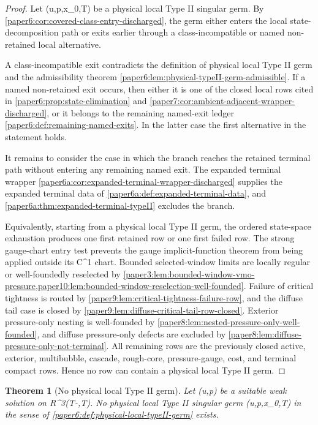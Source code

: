 \documentclass[11pt]{amsart}
\def\({}%
\def\){}%
\def\mathbb#1{#1}%
\theoremstyle{plain}
\newtheorem{theorem}{Theorem}[section]
\theoremstyle{definition}
\theoremstyle{remark}
\begin{document}
\begin{proof}
Let \((u,p,x_0,T)\) be a physical local Type II singular germ.  By
\cref{paper6:cor:covered-class-entry-discharged}, the germ either enters the
local state-decomposition path or exits earlier through a class-incompatible
or named non-retained local alternative.
\par
A class-incompatible exit contradicts the definition of physical local Type II
germ and the admissibility theorem
\cref{paper6:lem:physical-typeII-germ-admissible}.  If a named non-retained
exit occurs, then either it is one of the closed local rows cited in
\cref{paper6:prop:state-elimination} and
\cref{paper7:cor:ambient-adjacent-wrapper-discharged}, or it belongs to the
remaining named-exit ledger
\cref{paper6:def:remaining-named-exits}.  In the latter case the first
alternative in the statement holds.
\par
It remains to consider the case in which the branch reaches the retained
terminal path without entering any remaining named exit.  The expanded terminal
wrapper
\cref{paper6a:cor:expanded-terminal-wrapper-discharged} supplies the expanded
terminal data of \cref{paper6a:def:expanded-terminal-data}, and
\cref{paper6a:thm:expanded-terminal-typeII} excludes the branch.
\par
Equivalently, starting from a physical local Type II germ, the ordered
state-space exhaustion produces one first retained row or one first failed row.
The strong gauge-chart entry test prevents the gauge implicit-function theorem
from being applied outside its \(C^1\) chart.  Bounded selected-window limits
are locally regular or well-foundedly reselected by
\cref{paper3:lem:bounded-window-vmo-pressure,paper10:lem:bounded-window-reselection-well-founded}.
Failure of critical tightness is routed by
\cref{paper9:lem:critical-tightness-failure-row}, and the diffuse tail case is
closed by \cref{paper9:lem:diffuse-critical-tail-row-closed}.  Exterior
pressure-only nesting is well-founded by
\cref{paper8:lem:nested-pressure-only-well-founded}, and diffuse pressure-only
defects are excluded by
\cref{paper8:lem:diffuse-pressure-only-not-terminal}.  All remaining rows are
the previously closed active, exterior, multibubble, cascade, rough-core,
pressure-gauge, cost, and terminal compact rows.  Hence no row can contain a
physical local Type II germ.
\end{proof}

\begin{theorem}[No physical local Type II germ]
\label{paper6:thm:unconditional-no-typeII-discharged}
Let \((u,p)\) be a suitable weak solution on
\(\mathbb R^3\times(T-\delta,T)\).  No physical local Type II singular germ
\((u,p,x_0,T)\) in the sense of
\cref{paper6:def:physical-local-typeII-germ} exists.
\end{theorem}
\end{document}
